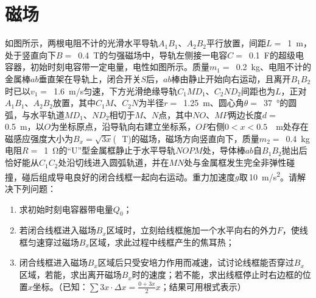 \section{磁场}

\begin{proset}
    如图所示，两根电阻不计的光滑水平导轨\(A_1B_1\)、\(A_2B_2\)平行放置，间距\(L =\) \,\qty{1}{m}，处于竖直向下\(B =\) \,\qty{0.4}{T}的匀强磁场中，导轨左侧接一电容\(C =\) \,\qty{0.1}{F}的超级电容器，初始时刻电容带一定电量，电性如图所示。质量\(m_1 =\) \,\qty{0.2}{kg}、电阻不计的金属棒\(ab\)垂直架在导轨上，闭合开关\(S\)后，\(ab\)棒由静止开始向右运动，且离开\(B_1B_2\)时已以\(v_1 =\) \,\qty{1.6}{m/s}匀速，下方光滑绝缘导轨\(C_1MD_1\)、\(C_2ND_2\)间距也为\(L\)，正对\(A_1B_1\)、\(A_2B_2\)放置，其中\(C_1M\)、\(C_2N\)为半径\(r =\) \,\qty{1.25}{m}、圆心角\(\theta =\) \,\qty{37}{\degree}的圆弧，与水平轨道\(MD_1\)、\(ND_2\)相切于\(M\)、\(N\)点，其中\(NO\)、\(MP\)两边长度\(d =\) \,\qty{0.5}{m}，以\(O\)为坐标原点，沿导轨向右建立坐标系，\(OP\)右侧\(0 < x < 0.5\) \,\qty{}{m}处存在磁感应强度大小为\(B_x = \sqrt{3x}\)(\,\qty{}{T})的磁场，磁场方向竖直向下，质量\(m_2 =\) \,\qty{0.4}{kg}电阻\(R =\) \,\qty{1}{\ohm}的“U”型金属框静止于水平导轨\(NOPM\)处，导体棒\(ab\)自\(B_1B_2\)抛出后恰好能从\(C_1C_2\)处沿切线进入圆弧轨道，并在\(MN\)处与金属框发生完全非弹性碰撞，碰后组成导电良好的闭合线框一起向右运动。重力加速度\(g\)取\,\qty{10}{m/s^2}。请解决下列问题：
    \begin{enumerate}[(1)]
        \item 求初始时刻电容器带电量\(Q_0\)；
        \item 若闭合线框进入磁场\(B_x\)区域时，立刻给线框施加一个水平向右的外力\(F\)，使线框匀速穿过磁场\(B_x\)区域，求此过程中线框产生的焦耳热；
        \item 闭合线框进入磁场\(B_x\)区域后只受安培力作用而减速，试讨论线框能否穿过\(B_x\)区域，若能，求出离开磁场\(B_x\)时的速度；若不能，求出线框停止时右边框的位置\(x\)坐标。（已知：\(\sum 3x\cdot\Delta x = \frac{0 + 3x}{2}x\)；结果可用根式表示）
    \end{enumerate}
\end{proset}
